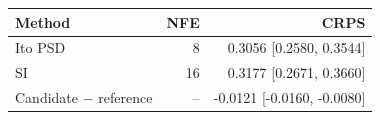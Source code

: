 \begin{tabular}{lrr}
\toprule
Method & NFE & CRPS \\
\midrule
Ito PSD & 8 & 0.3056 [0.2580, 0.3544] \\
SI & 16 & 0.3177 [0.2671, 0.3660] \\
\midrule
Candidate $-$ reference & -- & -0.0121 [-0.0160, -0.0080] \\
\bottomrule
\end{tabular}

